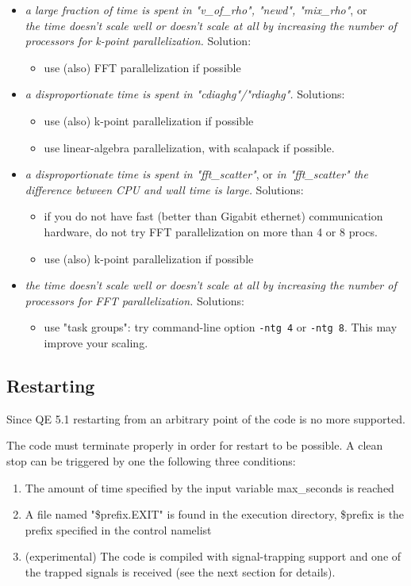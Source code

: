 \documentclass[12pt,a4paper]{article}
\begin{document}
\begin{itemize}
\item 
{\em  a large fraction of time is spent in "v\_of\_rho", "newd", "mix\_rho"}, or\\
{\em  the time doesn't scale well or doesn't scale at all by increasing the 
  number of processors for k-point parallelization.}  Solution:
\begin{itemize}
\item 
  use (also) FFT parallelization if possible
\end{itemize}
\item
{\em  a disproportionate time is spent in "cdiaghg"/"rdiaghg".} Solutions:
\begin{itemize}
\item 
   use (also) k-point parallelization if possible
\item 
   use linear-algebra parallelization, with scalapack if possible.
\end{itemize}
\item
{\em a disproportionate time is spent in "fft\_scatter"}, or
{\em in "fft\_scatter" the difference between CPU and wall time is large.} Solutions:
\begin{itemize}
\item 
    if you do not have fast (better than Gigabit ethernet) communication
    hardware, do not try FFT parallelization on more than 4 or 8 procs.
\item 
    use (also) k-point parallelization if possible
\end{itemize}
\item
{\em  the time doesn't scale well or doesn't scale at all by increasing the 
  number of processors for FFT parallelization.}
    Solutions:
\begin{itemize}
\item 
    use "task groups": try command-line option \texttt{-ntg 4} or
    \texttt{-ntg 8}. This may improve your scaling.
\end{itemize}
\end{itemize}

\subsection{Restarting}

Since QE 5.1 restarting from an arbitrary point of the code is no more supported.

The code must terminate properly in order for restart to be possible. A clean stop can be triggered by one the following three conditions:
\begin{enumerate}
\item The amount of time specified by the input variable max\_seconds is reached
\item A file named "\$prefix.EXIT" is found in the execution directory, \$prefix is the prefix specified in the control namelist
\item (experimental) The code is compiled with signal-trapping support and one of the trapped signals is received (see the next section for details).
\end{enumerate}
\end{document}

